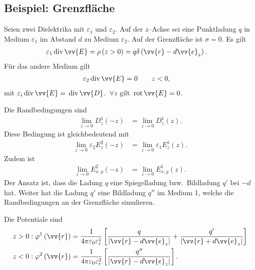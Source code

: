 \documentclass[a4paper,12pt]{article}
\numberwithin{equation}{section}
\begin{document}
\subsection{Beispiel: Grenzfläche}
Seien zwei Dielektrika mit $\varepsilon _1$ und $\varepsilon _2$. Auf der $z$--Achse sei eine Punktladung $q$ in Medium $\varepsilon _1$ im Abstand $d$ zu Medium $\varepsilon _2$. Auf der Grenzfläche ist $\sigma =0$.
Es gilt
\begin{align} 
        \varepsilon _1\,\text{div}\,\vv{E}&=\rho \left(z>0\right)=q\delta \left(\vv{r}-d\vv{e}_z\right)
.\end{align} 
Für das andere Medium gilt
\begin{align} 
        \varepsilon _2\,\text{div}\,\vv{E}&=0\qquad z<0
,\end{align} 
mit $\varepsilon _i\,\text{div}\,\vv{E}=\,\text{div}\,\vv{D}$.
$\,\forall z$ gilt $\,\text{rot}\,\vv{E}=0$.\par
Die Randbedingungen sind
\begin{align} 
        \lim_{z\rightarrow 0}D_z^1\left(-z\right)&=\lim_{z\rightarrow 0}D_z^1\left(z\right)
.\end{align} 
Diese Bedingung ist gleichbedeutend mit
\begin{align} 
        \lim_{z\rightarrow 0}\varepsilon _2E_z^2\left(-z\right)&=\lim_{z\rightarrow 0}\varepsilon _1E_z^1\left(z\right)
.\end{align} 
Zudem ist
\begin{align} 
        \lim_{z\rightarrow 0}E_{x,y}^2\left(-z\right)&=\lim_{z\rightarrow 0}E_{x,y}^1\left(z\right)
.\end{align} 
Der Ansatz ist, dass die Ladung $q$ eine Spiegelladung bzw.\ Bildladung $q'$ bei $-d$ hat. Weiter hat die Ladung $q'$ eine Bildladung $q''$ im Medium 1, welche die Randbedingungen an der Grenzfläche simulieren.\par
Die Potentiale sind
\begin{align} 
        z>0&:\varphi ^1\left(\vv{r}\right)=\dfrac{1}{4\pi \varepsilon _0\varepsilon _r^1}\left[\dfrac{q}{|\vv{r}-d\vv{e}_z|}+\dfrac{q'}{|\vv{r}+d\vv{e}_z|}\right]\\
        z<0&:\varphi ^2\left(\vv{r}\right)=\dfrac{1}{4\pi \varepsilon _0\varepsilon _r^2}\left[\dfrac{q''}{|\vv{r}-d\vv{e}_z|}\right]
.\end{align} 

\newpage
\end{document}
